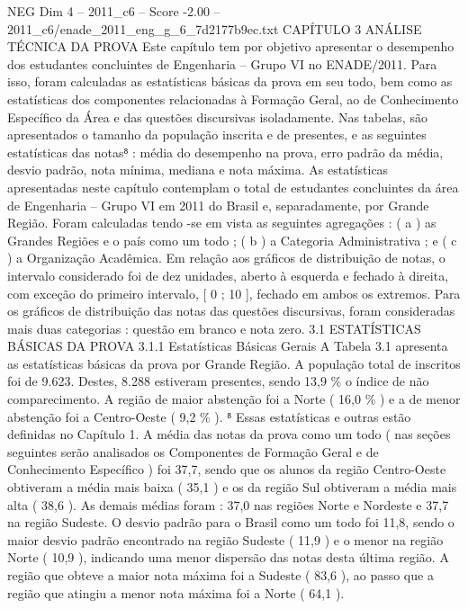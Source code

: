 \begin{textsample}{NEG Dim 4 – 2011\_c6 – Score -2.00 – 2011\_c6/enade\_2011\_eng\_g\_6\_7d2177b9ec.txt}  \label{ex:f4_neg_055}
CAPÍTULO 3 ANÁLISE TÉCNICA DA PROVA Este capítulo tem por objetivo apresentar o desempenho dos estudantes concluintes de Engenharia – Grupo VI no ENADE/2011.
Para isso, foram calculadas as estatísticas básicas da prova em seu todo, bem como as estatísticas dos componentes relacionadas à Formação Geral, ao de Conhecimento Específico da Área e das questões discursivas isoladamente.
Nas tabelas, são apresentados o tamanho da população inscrita e de presentes, e as seguintes estatísticas das notas⁸ : média do desempenho na prova, erro padrão da média, desvio padrão, nota mínima, mediana e nota máxima.
As estatísticas apresentadas neste capítulo contemplam o total de estudantes concluintes da área de Engenharia – Grupo VI em 2011 do Brasil e, separadamente, por Grande Região.
Foram calculadas tendo -se em vista as seguintes agregações : ( a ) as Grandes Regiões e o país como um todo ; ( b ) a Categoria Administrativa ; e ( c ) a Organização Acadêmica.
Em relação aos gráficos de distribuição de notas, o intervalo considerado foi de dez unidades, aberto à esquerda e fechado à direita, com exceção do primeiro intervalo, [ 0 ; 10 ], fechado em ambos os extremos.
Para os gráficos de distribuição das notas das questões discursivas, foram consideradas mais duas categorias : questão em branco e nota zero. 3.1 ESTATÍSTICAS BÁSICAS DA PROVA 3.1.1 Estatísticas Básicas Gerais A Tabela 3.1 apresenta as estatísticas básicas da prova por Grande Região.
A população total de inscritos foi de 9.623.
Destes, 8.288 estiveram presentes, sendo 13,9 \% o índice de não comparecimento.
A região de maior abstenção foi a Norte ( 16,0 \% ) e a de menor abstenção foi a Centro-Oeste ( 9,2 \% ). ⁸ Essas estatísticas e outras estão definidas no Capítulo 1.
A média das notas da prova como um todo ( nas seções seguintes serão analisados os Componentes de Formação Geral e de Conhecimento Específico ) foi 37,7, sendo que os alunos da região Centro-Oeste obtiveram a média mais baixa ( 35,1 ) e os da região Sul obtiveram a média mais alta ( 38,6 ).
As demais médias foram : 37,0 nas regiões Norte e Nordeste e 37,7 na região Sudeste.
O desvio padrão para o Brasil como um todo foi 11,8, sendo o maior desvio padrão encontrado na região Sudeste ( 11,9 ) e o menor na região Norte ( 10,9 ), indicando uma menor dispersão das notas desta última região.
A região que obteve a maior nota máxima foi a Sudeste ( 83,6 ), ao passo que a região que atingiu a menor nota máxima foi a Norte ( 64,1 ).

\end{textsample}
